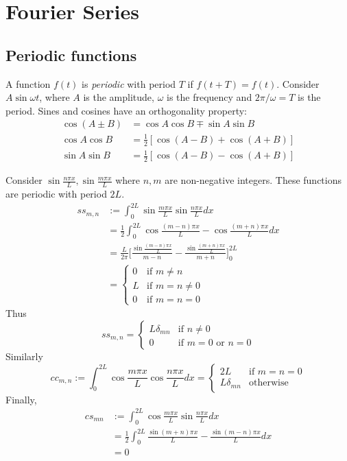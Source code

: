 \documentclass[a4paper]{article}
\begin{document}
\maketitle

\tableofcontents


\section{Fourier Series}

\subsection{Periodic functions}

A function $f(t)$ is \emph{periodic} with period $T$ if $f(t+T) = f(t)$. Consider $A \sin\omega t$, where $A$ is the amplitude, $\omega$ is the frequency and $2\pi/\omega=T$ is the period. Sines and cosines have an orthogonality property:
\begin{align*}
  \cos(A\pm B) &= \cos A\cos B \mp \sin A\sin B \\
  \cos A \cos B &= \frac{1}{2}[\cos(A-B)+\cos(A+B)] \\
  \sin A \sin B &= \frac{1}{2}[\cos(A-B)-\cos(A+B)]
\end{align*}

Consider $\sin\frac{n\pi x}{L}, \sin\frac{m\pi x}{L}$ where $n,m$ are non-negative integers. These functions are periodic with period $2L$.
\begin{align*}
  ss_{m,n} &:= \int_0^{2L}\sin\frac{m\pi x}{L}\sin\frac{n\pi x}{L} dx \\
  &= \frac{1}{2}\int_0^{2L}\cos\frac{(m-n)\pi x}{L} - \cos\frac{(m+n)\pi x}{L} dx \\
          &= \frac{L}{2\pi}\Bigg[\frac{\sin\frac{(m-n)\pi x}{L}}{m-n} - \frac{\sin\frac{(m+n)\pi x}{L}}{m+n}\Bigg]_0^{2L}\\
           &=
             \begin{cases}
               0 & \text{if } m\neq n \\
               L & \text{if } m=n\neq 0 \\
               0 & \text{if } m=n=0
             \end{cases}
\end{align*}
Thus
\[
  ss_{m,n}=
  \begin{cases}
    L \delta_{mn} &\text{if } n\neq 0 \\
    0 &\text{if } m=0 \text{ or } n=0
  \end{cases}
\]
Similarly
\[
  cc_{m,n} := \int_0^{2L}\cos\frac{m\pi x}{L}\cos\frac{n\pi x}{L} dx =
  \begin{cases}
    2L &\text{if } m=n=0 \\
    L\delta_{mn} &\text{otherwise}
  \end{cases}
\]
Finally,
\begin{align*}
  cs_{mn} &:= \int_0^{2L}\cos\frac{m\pi x}{L}\sin\frac{n\pi x}{L} dx \\
          &= \frac{1}{2}\int_0^{2L}\frac{\sin (m+n)\pi x}{L} - \frac{\sin (m-n)\pi x}{L} dx \\
          &= 0
\end{align*}
\end{document}
